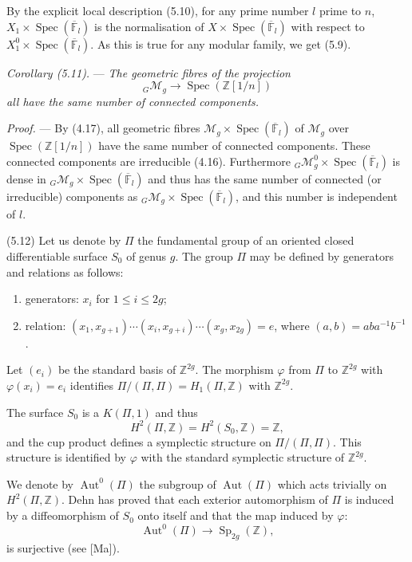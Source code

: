 \documentclass[10pt]{article}
\newcommand{\Spec}{\operatorname{Spec}}
\newcommand{\Aut}{\operatorname{Aut}}
\begin{document}
By the explicit local description (5.10), for any prime number $l$ prime to $n$, $X_1\times\Spec(\overline{\mathbb F}_l)$ is the normalisation of $X\times\Spec(\overline{\mathbb F}_l)$ with respect to $X_1^0\times\Spec(\overline{\mathbb F}_l)$. As this is true for any modular family, we get (5.9).

\medskip
\noindent\emph{Corollary (5.11).} --- \emph{The geometric fibres of the projection}
\[
{}_G\mathcal M_g\longrightarrow \Spec(\mathbb Z[1/n])
\]
\emph{all have the same number of connected components.}

\noindent\emph{Proof.} --- By (4.17), all geometric fibres $\mathcal M_g\times\Spec(\overline{\mathbb F}_l)$ of $\mathcal M_g$ over $\Spec(\mathbb Z[1/n])$ have the same number of connected components. These connected components are irreducible (4.16). Furthermore ${}_G\mathcal M_g^0\times\Spec(\overline{\mathbb F}_l)$ is dense in ${}_G\mathcal M_g\times\Spec(\overline{\mathbb F}_l)$ and thus has the same number of connected (or irreducible) components as ${}_G\mathcal M_g\times\Spec(\overline{\mathbb F}_l)$, and this number is independent of $l$.

\medskip
\noindent(5.12) Let us denote by $\Pi$ the fundamental group of an oriented closed differentiable surface $S_0$ of genus $g$. The group $\Pi$ may be defined by generators and relations as follows:
\begin{enumerate}[label=(\roman*)]
\item generators: $x_i$ for $1\leq i\leq 2g$;
\item relation: $(x_1,x_{g+1})\cdots(x_i,x_{g+i})\cdots(x_g,x_{2g})=e$, where $(a,b)=aba^{-1}b^{-1}$.
\end{enumerate}
Let $(e_i)$ be the standard basis of $\mathbb Z^{2g}$. The morphism $\varphi$ from $\Pi$ to $\mathbb Z^{2g}$ with $\varphi(x_i)=e_i$ identifies $\Pi/(\Pi,\Pi)=H_1(\Pi,\mathbb Z)$ with $\mathbb Z^{2g}$.

The surface $S_0$ is a $K(\Pi,1)$ and thus
\[
H^2(\Pi,\mathbb Z)=H^2(S_0,\mathbb Z)=\mathbb Z,
\]
and the cup product defines a symplectic structure on $\Pi/(\Pi,\Pi)$. This structure is identified by $\varphi$ with the standard symplectic structure of $\mathbb Z^{2g}$.

We denote by $\Aut^0(\Pi)$ the subgroup of $\Aut(\Pi)$ which acts trivially on $H^2(\Pi,\mathbb Z)$. Dehn has proved that each exterior automorphism of $\Pi$ is induced by a diffeomorphism of $S_0$ onto itself and that the map induced by $\varphi$:
\[
\Aut^0(\Pi)\longrightarrow \operatorname{Sp}_{2g}(\mathbb Z),
\]
is surjective (see [Ma]).
\end{document}
